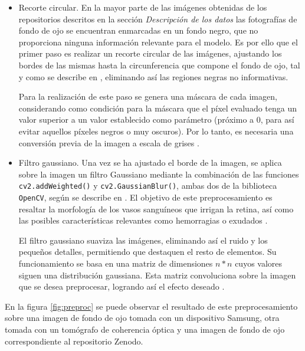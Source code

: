 \begin{itemize}[itemsep=0.25em]
    \item Recorte circular. En la mayor parte de las imágenes obtenidas de los repositorios descritos en la sección \textit{Descripción de los datos} las fotografías de fondo de ojo se encuentran enmarcadas en un fondo negro, que no proporciona ninguna información relevante para el modelo. Es por ello que el primer paso es realizar un recorte circular de las imágenes, ajustando los bordes de las mismas hasta la circunferencia que compone el fondo de ojo, tal y como se describe en \cite{preproc:kaggle}, eliminando así las regiones negras no informativas.

    Para la realización de este paso se genera una máscara de cada imagen, considerando como condición para la máscara que el píxel evaluado tenga un valor superior a un valor establecido como parámetro (próximo a 0, para así evitar aquellos píxeles negros o muy oscuros). Por lo tanto, es necesaria una conversión previa de la imagen a escala de grises \cite{preproc:kaggle}.
    
    \item Filtro gaussiano. Una vez se ha ajustado el borde de la imagen, se aplica sobre la imagen un filtro Gaussiano mediante la combinación de las funciones \texttt{cv2.addWeighted()} y \texttt{cv2.GaussianBlur()}, ambas dos de la biblioteca \texttt{OpenCV}, según se describe en \cite{preproc:kaggle}. El objetivo de este preprocesamiento es resaltar la morfología de los vasos sanguíneos que irrigan la retina, así como las posibles características relevantes como hemorragias o exudados \cite{preproc:maison}. 

    El filtro gaussiano suaviza las imágenes, eliminando así el ruido y los pequeños detalles, permitiendo que destaquen el resto de elementos. Su funcionamiento se basa en una matriz de dimensiones $n*n$ cuyos valores siguen una distribución gaussiana. Esta matriz convoluciona sobre la imagen que se desea preprocesar, logrando así el efecto deseado \cite{preproc:ieee}.
\end{itemize}

En la figura \ref{fig:preproc} se puede observar el resultado de este preprocesamiento sobre una imagen de fondo de ojo tomada con un dispositivo Samsung, otra tomada con un tomógrafo de coherencia óptica y una imagen de fondo de ojo correspondiente al repositorio Zenodo.

